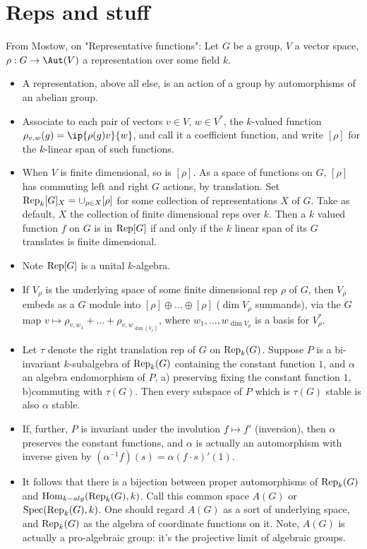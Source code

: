 \documentclass[11pt]{amsart}
\begin{document}
\section{Reps and stuff}
From Mostow, on "Representative functions": Let $G$ be a group, $V$ a vector space, $\rho: G\to \Aut(V)$ a representation over some field $k$. 

\begin{itemize}
	\item A representation, above all else, is an action of a group by automorphisms of an abelian group.
	\item Associate to each pair of vectors $v\in V$, $w\in V^*$, the $k$-valued function $\rho_{v,w}(g)=\ip{\rho(g)v}{w}$, and call it a coefficient function, and write $[\rho]$ for the $k$-linear span of such functions. 
	\item When $V$ is finite dimensional, so is $[\rho]$. As a space of functions on $G$, $[\rho]$ has commuting left and right $G$ actions, by translation. Set $\operatorname{Rep}_k[G]_X= \cup_{\rho \in X} [\rho]$ for some collection of representations $X$ of $G$. Take as default, $X$ the collection of finite dimensional reps over $k$. Then a $k$ valued function $f$ on $G$ is in $\operatorname{Rep}[G]$ if and only if the $k$ linear span of its $G$ translates is finite dimensional. 
	\item Note $\operatorname{Rep}[G]$ is a unital $k$-algebra.
	\item If $V_\rho$ is the underlying space of some finite dimensional rep $\rho$ of $G$, then $V_\rho$ embeds as a $G$ module into $[\rho] \oplus ... \oplus [\rho]$ ($\dim V_\rho$ summands), via the $G$ map $v \mapsto \rho_{v,w_1}+...+\rho_{v,w_{\dim(V_\rho)}}$, where $w_1,...,w_{\dim V_\rho}$ is a basis for $V_\rho ^*$.
	\item Let $\tau$ denote the right translation rep of $G$ on $\operatorname{Rep}_k(G)$. Suppose $P$ is a bi-invariant $k$-subalgebra of $\operatorname{Rep}_k(G)$ containing the constant function $1$, and $\alpha$ an algebra endomorphism of $P$, a) preserving fixing the constant function $1$, b)commuting with $\tau(G)$. Then every subspace of $P$ which is $\tau(G)$ stable is also $\alpha$ stable. 
	\item If, further, $P$ is invariant under the involution $f\mapsto f'$ (inversion), then $\alpha$ preserves the  constant functions, and $\alpha$ is actually an automorphism with inverse given by $(\alpha^{-1} f)(s)=\alpha (f\cdot s)'(1)$.
	\item It follows that there is a bijection between proper automorphisms of $\operatorname{Rep}_k(G)$ and $\operatorname{Hom}_{k-alg}(\operatorname{Rep}_k(G),k)$.  Call this common space $A(G)$ or $\operatorname{Spec}(\operatorname{Rep}_k(G),k)$. One should regard $A(G)$ as a sort of underlying space, and $\operatorname{Rep}_k(G)$ as the algebra of coordinate functions on it. Note, $A(G)$ is actually a pro-algebraic group: it's the projective limit of algebraic groups. 

\end{itemize}
\end{document}

